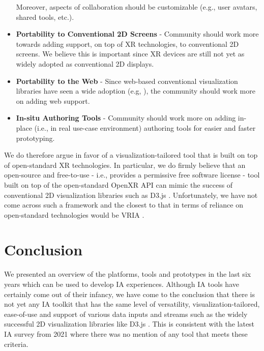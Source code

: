 \documentclass{vgtc}                          %
\begin{document}
\begin{itemize}
          Moreover, aspects of collaboration should be customizable (e.g., user avatars, shared tools, etc.).
	\item \textbf{Portability to Conventional 2D Screens} - Community should
	      work more towards adding support, on top of XR technologies, to
	      conventional 2D screens. We believe this is important since XR
          devices are still not yet as widely adopted as conventional 2D displays.
	\item \textbf{Portability to the Web} - Since web-based conventional visualization libraries have seen a
          wide adoption (e.g, \cite{d3_js}), the community should work more on adding web support.
	\item \textbf{In-situ Authoring Tools} - Community should work more on adding in-place (i.e., in real
          use-case environment) authoring tools for easier and faster prototyping.
\end{itemize}

\noindent We do therefore argue in favor of a visualization-tailored tool that is built on top of
open-standard XR technologies. In particular, we do firmly believe that an open-source and free-to-use -
i.e., provides a permissive free software license - tool built on top of the open-standard OpenXR API can
mimic the success of conventional 2D visualization libraries such as D3.js \cite{d3_js}. Unfortunately, we
have not come across such a framework and the closest to that in terms of reliance on open-standard
technologies would be VRIA \cite{vria_framework}.

\section{Conclusion}
We presented an overview of the platforms, tools and prototypes in the last six years which can be used to
develop IA experiences. Although IA tools have certainly come out of their infancy, we have come to the
conclusion that there is not yet any IA toolkit that has the same level of versatility,
visualization-tailored, ease-of-use and support of various data inputs and streams such as the widely
successful 2D visualization libraries like D3.js \cite{d3_js}. This is consistent with the latest IA survey
from 2021 \cite{survey_of_ia} where there was no mention of any tool that meets these criteria.

\printbibliography
\end{document}
